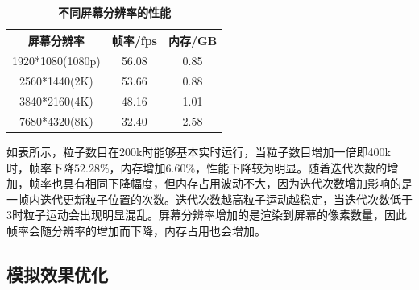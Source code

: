 \begin{table}[H]
    \caption{\textbf{不同屏幕分辨率的性能}}
    \label{tab:resolution}
    \centering
    \begin{tabular}{ccc}
        \toprule
        屏幕分辨率 & 帧率/fps & 内存/GB \\
        \midrule
        1920*1080(1080p) & 56.08 & 0.85 \\
        2560*1440(2K) & 53.66 & 0.88 \\
        3840*2160(4K) & 48.16 & 1.01 \\
        7680*4320(8K) & 32.40 & 2.58 \\
        \bottomrule
    \end{tabular}
\end{table}

如表所示，粒子数目在200k时能够基本实时运行，当粒子数目增加一倍即400k时，帧率下降$52.28\%$，内存增加$6.60\%$，性能下降较为明显。随着迭代次数的增加，帧率也具有相同下降幅度，但内存占用波动不大，因为迭代次数增加影响的是一帧内迭代更新粒子位置的次数。迭代次数越高粒子运动越稳定，当迭代次数低于3时粒子运动会出现明显混乱。屏幕分辨率增加的是渲染到屏幕的像素数量，因此帧率会随分辨率的增加而下降，内存占用也会增加。

\subsection{模拟效果优化}

